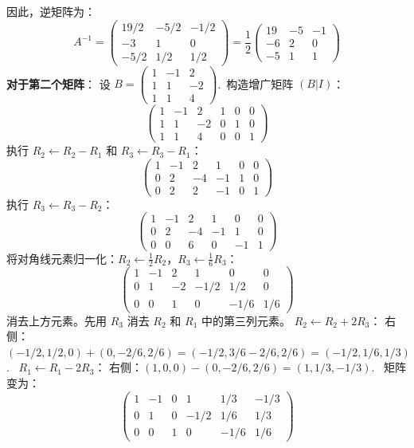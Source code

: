 \begin{exer}
因此，逆矩阵为：
$$ A^{-1} = \begin{pmatrix} 19/2 & -5/2 & -1/2 \\ -3 & 1 & 0 \\ -5/2 & 1/2 & 1/2 \end{pmatrix} = \frac{1}{2} \begin{pmatrix} 19 & -5 & -1 \\ -6 & 2 & 0 \\ -5 & 1 & 1 \end{pmatrix} $$
\textbf{对于第二个矩阵}：
设 $B = \begin{pmatrix} 1 & -1 & 2 \\ 1 & 1 & -2 \\ 1 & 1 & 4 \end{pmatrix}$.~构造增广矩阵 $(B|I)$：
$$ \left(\begin{array}{ccc|ccc} 1 & -1 & 2 & 1 & 0 & 0 \\ 1 & 1 & -2 & 0 & 1 & 0 \\ 1 & 1 & 4 & 0 & 0 & 1 \end{array}\right) $$
执行 $R_2 \leftarrow R_2 - R_1$ 和 $R_3 \leftarrow R_3 - R_1$：
$$ \left(\begin{array}{ccc|ccc} 1 & -1 & 2 & 1 & 0 & 0 \\ 0 & 2 & -4 & -1 & 1 & 0 \\ 0 & 2 & 2 & -1 & 0 & 1 \end{array}\right) $$
执行 $R_3 \leftarrow R_3 - R_2$：
$$ \left(\begin{array}{ccc|ccc} 1 & -1 & 2 & 1 & 0 & 0 \\ 0 & 2 & -4 & -1 & 1 & 0 \\ 0 & 0 & 6 & 0 & -1 & 1 \end{array}\right) $$
将对角线元素归一化：$R_2 \leftarrow \frac{1}{2}R_2$，$R_3 \leftarrow \frac{1}{6}R_3$：
$$ \left(\begin{array}{ccc|ccc} 1 & -1 & 2 & 1 & 0 & 0 \\ 0 & 1 & -2 & -1/2 & 1/2 & 0 \\ 0 & 0 & 1 & 0 & -1/6 & 1/6 \end{array}\right) $$
消去上方元素。先用 $R_3$ 消去 $R_2$ 和 $R_1$ 中的第三列元素。
$R_2 \leftarrow R_2 + 2R_3$：
右侧：$(-1/2, 1/2, 0) + (0, -2/6, 2/6) = (-1/2, 3/6-2/6, 2/6) = (-1/2, 1/6, 1/3)$.~
$R_1 \leftarrow R_1 - 2R_3$：
右侧：$(1, 0, 0) - (0, -2/6, 2/6) = (1, 1/3, -1/3)$.~
矩阵变为：
$$ \left(\begin{array}{ccc|ccc} 1 & -1 & 0 & 1 & 1/3 & -1/3 \\ 0 & 1 & 0 & -1/2 & 1/6 & 1/3 \\ 0 & 0 & 1 & 0 & -1/6 & 1/6 \end{array}\right) $$

\end{exer}
